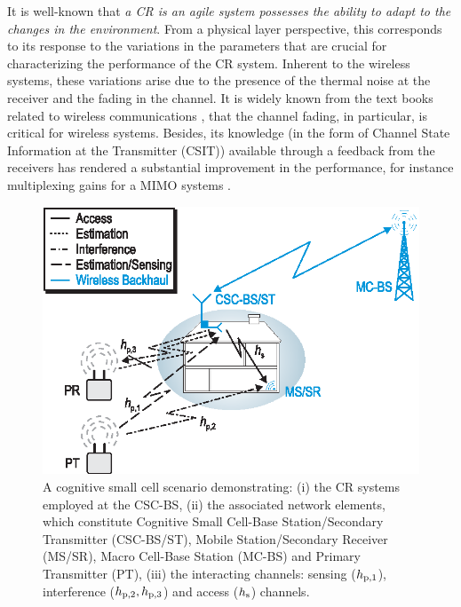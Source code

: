 It is well-known that \textit{a CR is an agile system possesses the ability to adapt to the changes in the environment}. From a physical layer perspective, this corresponds to its response to the variations in the parameters that are crucial for characterizing the performance of the CR system. Inherent to the wireless systems, these variations arise due to the presence of the thermal noise at the receiver and the fading in the channel. It is widely known from the text books related to wireless communications \cite{simon2005, Goldsmith05, Tse05}, that the channel fading, in particular, is critical for wireless systems. Besides, its knowledge (in the form of Channel State Information at the Transmitter (CSIT)) available through a feedback from the receivers has rendered a substantial improvement in the performance, for instance multiplexing gains for a MIMO systems \cite{Ali12}. 


\begin{figure}[!t]
\centering
\includegraphics[width = \figscalet]{figures/CR_Scenario_Hybrid}
\caption{A cognitive small cell scenario demonstrating: (i) the CR systems employed at the CSC-BS, (ii) the associated network elements, which constitute Cognitive Small Cell-Base Station/Secondary Transmitter (CSC-BS/ST), Mobile Station/Secondary Receiver (MS/SR), Macro Cell-Base Station (MC-BS) and Primary Transmitter (PT), (iii) the interacting channels: sensing ($h_{\text{p,1}}$), interference ($h_{\text{p,2}}, h_{\text{p,3}}$) and access ($h_{\text{s}}$) channels.}
\label{fig:scenario}
\end{figure}


